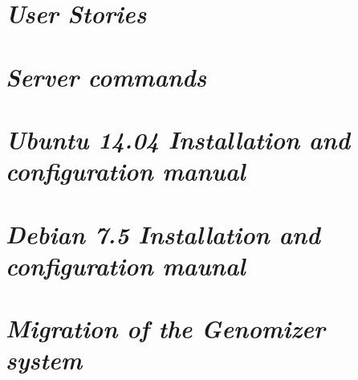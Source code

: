 \begin{appendix}

\chapter{\textit{User Stories}}

\chapter{\textit{Server commands}}

\chapter{\textit{Ubuntu 14.04 Installation and configuration manual}}

\chapter{\textit{Debian 7.5 Installation and configuration maunal}}

\chapter{\textit{Migration of the Genomizer system}}

\end{appendix}
